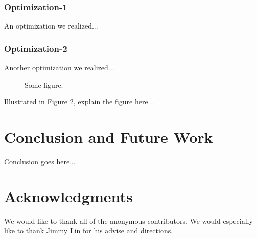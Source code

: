 \documentclass{acm_proc_article-sp}
\begin{document}
\subsubsection{Optimization-1}
An optimization we realized...

\subsubsection{Optimization-2}
Another optimization we realized...

\begin{figure*}
\centering
{}
\caption{Some figure.}
\end{figure*}

Illustrated in Figure 2, explain the figure here...

\section{Conclusion and Future Work}
Conclusion goes here...


\section{Acknowledgments}
We would like to thank all of the anonymous contributors. We would especially like to thank Jimmy Lin for his advise and directions.

%

%
%
\balancecolumns
\end{document}
